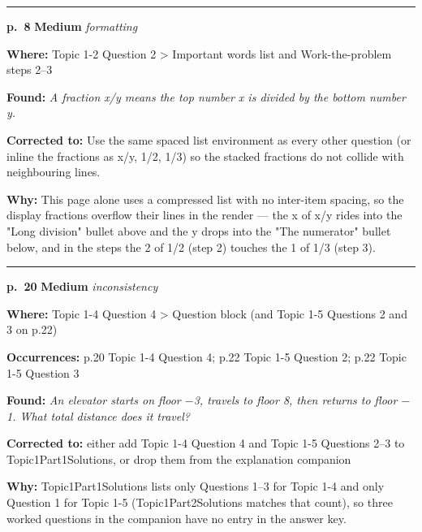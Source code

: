 \documentclass[11pt]{article}
\newcommand{\sevmed}[1]{\textcolor{orange!80!black}{\textbf{#1}}}
\begin{document}
\noindent\rule{\textwidth}{0.4pt}\par\nobreak\vspace{2pt}
\noindent\textbf{p.~8} \quad \sevmed{Medium} \quad \textit{formatting}\par
\noindent\textbf{Where: }Topic 1-2 Question 2 > Important words list and Work-the-problem steps 2--3\par
\noindent\textbf{Found: }\textit{A fraction x/y means the top number x is divided by the bottom number y.}\par
\noindent\textbf{Corrected to: }Use the same spaced list environment as every other question (or inline the fractions as x/y, 1/2, 1/3) so the stacked fractions do not collide with neighbouring lines.\par
\noindent\textbf{Why: }This page alone uses a compressed list with no inter-item spacing, so the display fractions overflow their lines in the render --- the x of x/y rides into the "Long division" bullet above and the y drops into the "The numerator" bullet below, and in the steps the 2 of 1/2 (step 2) touches the 1 of 1/3 (step 3).\par\vspace{4pt}
\noindent\rule{\textwidth}{0.4pt}\par\nobreak\vspace{2pt}
\noindent\textbf{p.~20} \quad \sevmed{Medium} \quad \textit{inconsistency}\par
\noindent\textbf{Where: }Topic 1-4 Question 4 > Question block (and Topic 1-5 Questions 2 and 3 on p.22)\par
\noindent\textbf{Occurrences: }p.20 Topic 1-4 Question 4; p.22 Topic 1-5 Question 2; p.22 Topic 1-5 Question 3\par
\noindent\textbf{Found: }\textit{An elevator starts on floor $-$3, travels to floor 8, then returns to floor $-$1. What total distance does it travel?}\par
\noindent\textbf{Corrected to: }either add Topic 1-4 Question 4 and Topic 1-5 Questions 2--3 to Topic1Part1Solutions, or drop them from the explanation companion\par
\noindent\textbf{Why: }Topic1Part1Solutions lists only Questions 1--3 for Topic 1-4 and only Question 1 for Topic 1-5 (Topic1Part2Solutions matches that count), so three worked questions in the companion have no entry in the answer key.\par\vspace{4pt}
\end{document}
